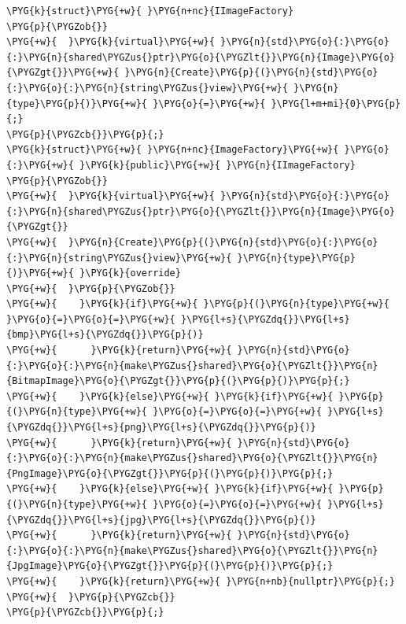 \begin{codeblockbg}
\begin{Verbatim}[commandchars=\\\{\},breaklines=true,breakanywhere=true,fontsize=\codefont,xleftmargin=17bp]
\PYG{k}{struct}\PYG{+w}{ }\PYG{n+nc}{IImageFactory}
\PYG{p}{\PYGZob{}}
\PYG{+w}{  }\PYG{k}{virtual}\PYG{+w}{ }\PYG{n}{std}\PYG{o}{:}\PYG{o}{:}\PYG{n}{shared\PYGZus{}ptr}\PYG{o}{\PYGZlt{}}\PYG{n}{Image}\PYG{o}{\PYGZgt{}}\PYG{+w}{ }\PYG{n}{Create}\PYG{p}{(}\PYG{n}{std}\PYG{o}{:}\PYG{o}{:}\PYG{n}{string\PYGZus{}view}\PYG{+w}{ }\PYG{n}{type}\PYG{p}{)}\PYG{+w}{ }\PYG{o}{=}\PYG{+w}{ }\PYG{l+m+mi}{0}\PYG{p}{;}
\PYG{p}{\PYGZcb{}}\PYG{p}{;}
\PYG{k}{struct}\PYG{+w}{ }\PYG{n+nc}{ImageFactory}\PYG{+w}{ }\PYG{o}{:}\PYG{+w}{ }\PYG{k}{public}\PYG{+w}{ }\PYG{n}{IImageFactory}
\PYG{p}{\PYGZob{}}
\PYG{+w}{  }\PYG{k}{virtual}\PYG{+w}{ }\PYG{n}{std}\PYG{o}{:}\PYG{o}{:}\PYG{n}{shared\PYGZus{}ptr}\PYG{o}{\PYGZlt{}}\PYG{n}{Image}\PYG{o}{\PYGZgt{}}
\PYG{+w}{  }\PYG{n}{Create}\PYG{p}{(}\PYG{n}{std}\PYG{o}{:}\PYG{o}{:}\PYG{n}{string\PYGZus{}view}\PYG{+w}{ }\PYG{n}{type}\PYG{p}{)}\PYG{+w}{ }\PYG{k}{override}
\PYG{+w}{  }\PYG{p}{\PYGZob{}}
\PYG{+w}{    }\PYG{k}{if}\PYG{+w}{ }\PYG{p}{(}\PYG{n}{type}\PYG{+w}{ }\PYG{o}{=}\PYG{o}{=}\PYG{+w}{ }\PYG{l+s}{\PYGZdq{}}\PYG{l+s}{bmp}\PYG{l+s}{\PYGZdq{}}\PYG{p}{)}
\PYG{+w}{      }\PYG{k}{return}\PYG{+w}{ }\PYG{n}{std}\PYG{o}{:}\PYG{o}{:}\PYG{n}{make\PYGZus{}shared}\PYG{o}{\PYGZlt{}}\PYG{n}{BitmapImage}\PYG{o}{\PYGZgt{}}\PYG{p}{(}\PYG{p}{)}\PYG{p}{;}
\PYG{+w}{    }\PYG{k}{else}\PYG{+w}{ }\PYG{k}{if}\PYG{+w}{ }\PYG{p}{(}\PYG{n}{type}\PYG{+w}{ }\PYG{o}{=}\PYG{o}{=}\PYG{+w}{ }\PYG{l+s}{\PYGZdq{}}\PYG{l+s}{png}\PYG{l+s}{\PYGZdq{}}\PYG{p}{)}
\PYG{+w}{      }\PYG{k}{return}\PYG{+w}{ }\PYG{n}{std}\PYG{o}{:}\PYG{o}{:}\PYG{n}{make\PYGZus{}shared}\PYG{o}{\PYGZlt{}}\PYG{n}{PngImage}\PYG{o}{\PYGZgt{}}\PYG{p}{(}\PYG{p}{)}\PYG{p}{;}
\PYG{+w}{    }\PYG{k}{else}\PYG{+w}{ }\PYG{k}{if}\PYG{+w}{ }\PYG{p}{(}\PYG{n}{type}\PYG{+w}{ }\PYG{o}{=}\PYG{o}{=}\PYG{+w}{ }\PYG{l+s}{\PYGZdq{}}\PYG{l+s}{jpg}\PYG{l+s}{\PYGZdq{}}\PYG{p}{)}
\PYG{+w}{      }\PYG{k}{return}\PYG{+w}{ }\PYG{n}{std}\PYG{o}{:}\PYG{o}{:}\PYG{n}{make\PYGZus{}shared}\PYG{o}{\PYGZlt{}}\PYG{n}{JpgImage}\PYG{o}{\PYGZgt{}}\PYG{p}{(}\PYG{p}{)}\PYG{p}{;}
\PYG{+w}{    }\PYG{k}{return}\PYG{+w}{ }\PYG{n+nb}{nullptr}\PYG{p}{;}
\PYG{+w}{  }\PYG{p}{\PYGZcb{}}
\PYG{p}{\PYGZcb{}}\PYG{p}{;}
\end{Verbatim}
\end{codeblockbg}



